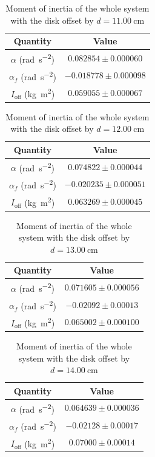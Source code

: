 \begin{table}[htb!]
\centering
\caption{Moment of inertia of the whole system with the disk offset by $d=\qty{11.00}{\cm}$}
\begin{tabular}{cc}
\toprule
Quantity & Value \\
\midrule
$\alpha$ (\unit{\radian\per\s\squared}) & $0.082854 \pm 0.000060$ \\
$\alpha_{f}$ (\unit{\radian\per\s\squared}) & $-0.018778 \pm 0.000098$ \\
$I_{\text{off}}$ (\unit{\kg\m\squared}) & $0.059055 \pm 0.000067$ \\
\bottomrule
\end{tabular}
\end{table}
\begin{table}[htb!]
\centering
\caption{Moment of inertia of the whole system with the disk offset by $d=\qty{12.00}{\cm}$}
\begin{tabular}{cc}
\toprule
Quantity & Value \\
\midrule
$\alpha$ (\unit{\radian\per\s\squared}) & $0.074822 \pm 0.000044$ \\
$\alpha_{f}$ (\unit{\radian\per\s\squared}) & $-0.020235 \pm 0.000051$ \\
$I_{\text{off}}$ (\unit{\kg\m\squared}) & $0.063269 \pm 0.000045$ \\
\bottomrule
\end{tabular}
\end{table}
\begin{table}[htb!]
\centering
\caption{Moment of inertia of the whole system with the disk offset by $d=\qty{13.00}{\cm}$}
\begin{tabular}{cc}
\toprule
Quantity & Value \\
\midrule
$\alpha$ (\unit{\radian\per\s\squared}) & $0.071605 \pm 0.000056$ \\
$\alpha_{f}$ (\unit{\radian\per\s\squared}) & $-0.02092 \pm 0.00013$ \\
$I_{\text{off}}$ (\unit{\kg\m\squared}) & $0.065002 \pm 0.000100$ \\
\bottomrule
\end{tabular}
\end{table}
\begin{table}[htb!]
\centering
\caption{Moment of inertia of the whole system with the disk offset by $d=\qty{14.00}{\cm}$}
\begin{tabular}{cc}
\toprule
Quantity & Value \\
\midrule
$\alpha$ (\unit{\radian\per\s\squared}) & $0.064639 \pm 0.000036$ \\
$\alpha_{f}$ (\unit{\radian\per\s\squared}) & $-0.02128 \pm 0.00017$ \\
$I_{\text{off}}$ (\unit{\kg\m\squared}) & $0.07000 \pm 0.00014$ \\
\bottomrule
\end{tabular}
\end{table}
